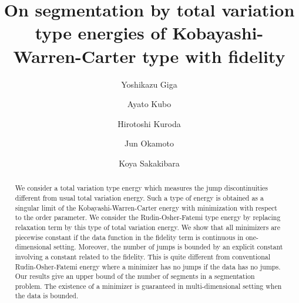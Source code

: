 \documentclass[11pt]{amsart} %
\numberwithin{equation}{section}
\begin{document}
\title[On segmentation by total variation type energies]{On segmentation by total variation type energies of Kobayashi-Warren-Carter type with fidelity}

\author[Y.~Giga]{Yoshikazu Giga}
\address[Y.~Giga]{Graduate School of Mathematical Sciences, The University of Tokyo} %

\author[A.~Kubo]{Ayato Kubo}
\address[A.~Kubo]{Department of Mathematics, Faculty of Science, Hokkaido University}

\author[H.~Kuroda]{Hirotoshi Kuroda}
\address[H.~Kuroda]{Department of Mathematics, Faculty of Science, Hokkaido University}

\author[J.~Okamoto]{Jun Okamoto}
\address[J.~Okamoto]{Institute for the Advanced Study of Human Biology, Kyoto University}

\author[K.~Sakakibara]{Koya Sakakibara}
\address[K.~Sakakibara]{Faculty of Mathematics and Physics, Institute of Science and Engineering, Kanazawa University; RIKEN iTHEMS}



\begin{abstract}
We consider a total variation type energy which measures the jump discontinuities different from usual total variation energy.
 Such a type of energy is obtained as a singular limit of the Kobayashi-Warren-Carter energy with minimization with respect to the order parameter.
 We consider the Rudin-Osher-Fatemi type energy by replacing relaxation term by this type of total variation energy.
 We show that all minimizers are piecewise constant if the data function in the fidelity term is continuous in one-dimensional setting.
 Moreover, the number of jumps is bounded by an explicit constant involving a constant related to the fidelity.
 This is quite different from conventional Rudin-Osher-Fatemi energy where a minimizer has no jumps if the data has no jumps.
 Our results give an upper bound of the number of segments in a segmentation problem.
 The existence of a minimizer is guaranteed in multi-dimensional setting when the data is bounded.
\end{abstract}
\end{document}
